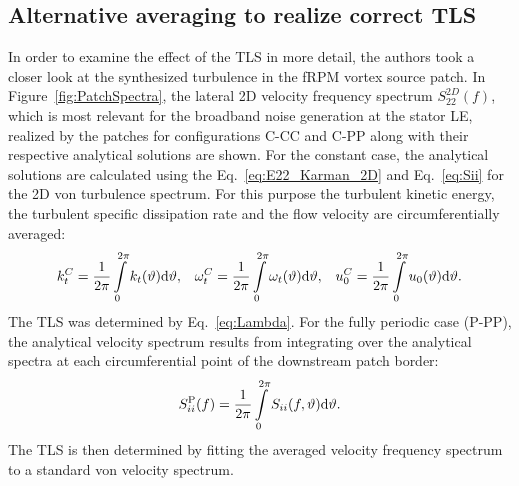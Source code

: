 \subsection{Alternative averaging to realize correct TLS}
In order to examine the effect of the TLS in more detail, the authors took a closer look at the synthesized turbulence in the fRPM vortex source patch.  In Figure~\ref{fig:PatchSpectra}, the lateral 2D velocity frequency spectrum $S^{2D}_{22}(f)$, which is most relevant for the broadband noise generation at the stator LE, realized by the patches for configurations C-CC and C-PP along with their respective analytical solutions are shown. For the constant case, the analytical solutions are calculated using the Eq.~\ref{eq:E22_Karman_2D} and Eq.~\ref{eq:Sii} for the 2D von \Karman turbulence spectrum. For this purpose the turbulent kinetic energy, the turbulent specific dissipation rate and the flow velocity are circumferentially averaged: 
\begin{align}\label{eq:LambdaC}
k_t^C = \frac{1}{2\pi}\int\limits_0^{2\pi} k_t(\vartheta)\text{d} \vartheta, &&
\omega_t^C = \frac{1}{2\pi}\int\limits_0^{2\pi} \omega_t(\vartheta)\text{d} \vartheta, &&
u_0^C = \frac{1}{2\pi}\int\limits_0^{2\pi} u_0(\vartheta)\text{d} \vartheta.
\end{align}
The TLS was determined by Eq.~\ref{eq:Lambda}. For the fully periodic case (P-PP), the analytical velocity spectrum results from integrating over the analytical spectra at each circumferential point of the downstream patch border:
\begin{align}\label{eq:Spii}
S^\text{P}_{ii}(f) = \frac{1}{2\pi}\int\limits_0^{2\pi}S_{ii}(f,\vartheta) \text{d} \vartheta.
\end{align}  
The TLS is then determined by fitting the averaged velocity frequency spectrum to a standard von \Karman velocity spectrum.  

